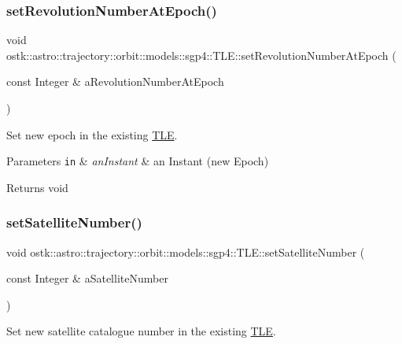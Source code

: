 \subsubsection{\texorpdfstring{set\+Revolution\+Number\+At\+Epoch()}{setRevolutionNumberAtEpoch()}}
{\footnotesize\ttfamily void ostk\+::astro\+::trajectory\+::orbit\+::models\+::sgp4\+::\+T\+L\+E\+::set\+Revolution\+Number\+At\+Epoch (\begin{DoxyParamCaption}\item[{const Integer \&}]{a\+Revolution\+Number\+At\+Epoch }\end{DoxyParamCaption})}



Set new epoch in the existing \hyperlink{classostk_1_1astro_1_1trajectory_1_1orbit_1_1models_1_1sgp4_1_1_t_l_e}{T\+LE}. 


\begin{DoxyParams}[1]{Parameters}
\mbox{\tt in}  & {\em an\+Instant} & an Instant (new Epoch) \\
\hline
\end{DoxyParams}
\begin{DoxyReturn}{Returns}
void 
\end{DoxyReturn}
\mbox{\label{classostk_1_1astro_1_1trajectory_1_1orbit_1_1models_1_1sgp4_1_1_t_l_e_aaa3ce99b1a69028a94094b95eb91da2c}} 
\subsubsection{\texorpdfstring{set\+Satellite\+Number()}{setSatelliteNumber()}}
{\footnotesize\ttfamily void ostk\+::astro\+::trajectory\+::orbit\+::models\+::sgp4\+::\+T\+L\+E\+::set\+Satellite\+Number (\begin{DoxyParamCaption}\item[{const Integer \&}]{a\+Satellite\+Number }\end{DoxyParamCaption})}



Set new satellite catalogue number in the existing \hyperlink{classostk_1_1astro_1_1trajectory_1_1orbit_1_1models_1_1sgp4_1_1_t_l_e}{T\+LE}. 


